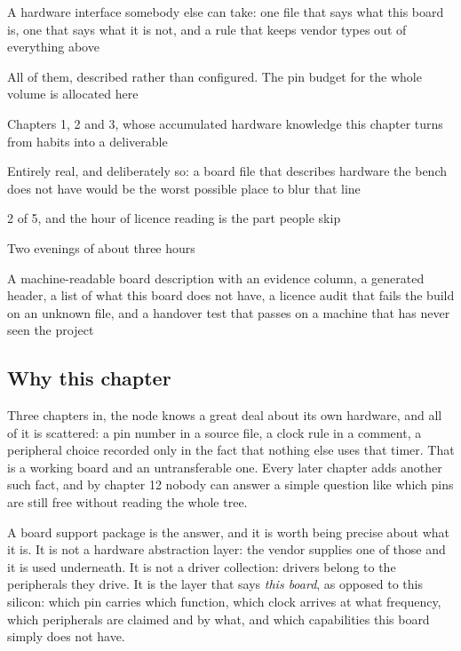 
\begin{keyfacts}
\item[Adds to the node] A hardware interface somebody else can take: one file that says what this board is, one that says what it is not, and a rule that keeps vendor types out of everything above
\item[Peripherals] All of them, described rather than configured. The pin budget for the whole volume is allocated here
\item[Depends on] Chapters 1, 2 and 3, whose accumulated hardware knowledge this chapter turns from habits into a deliverable
\item[Real or modelled] Entirely real, and deliberately so: a board file that describes hardware the bench does not have would be the worst possible place to blur that line
\item[Difficulty] 2 of 5, and the hour of licence reading is the part people skip
\item[Effort] Two evenings of about three hours
\item[Deliverable] A machine-readable board description with an evidence column, a generated header, a list of what this board does not have, a licence audit that fails the build on an unknown file, and a handover test that passes on a machine that has never seen the project
\end{keyfacts}

\subsection*{Why this chapter}

Three chapters in, the node knows a great deal about its own hardware, and all
of it is scattered: a pin number in a source file, a clock rule in a comment, a
peripheral choice recorded only in the fact that nothing else uses that timer.
That is a working board and an untransferable one. Every later chapter adds
another such fact, and by chapter 12 nobody can answer a simple question like
which pins are still free without reading the whole tree.

A board support package is the answer, and it is worth being precise about what
it is. It is not a hardware abstraction layer: the vendor supplies one of those
and it is used underneath. It is not a driver collection: drivers belong to the
peripherals they drive. It is the layer that says \emph{this board}, as opposed
to this silicon: which pin carries which function, which clock arrives at what
frequency, which peripherals are claimed and by what, and which capabilities
this board simply does not have.

